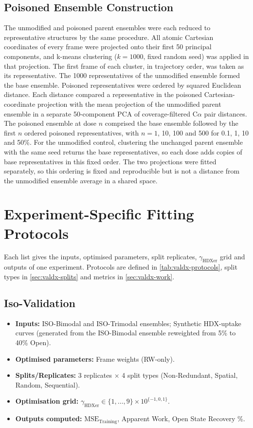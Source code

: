\subsection{Poisoned Ensemble Construction}
\label{app:valdx-poison-construction}

The unmodified and poisoned parent ensembles were each reduced to representative structures by the same procedure. All atomic Cartesian coordinates of every frame were projected onto their first 50 principal components, and k-means clustering ($k=1000$, fixed random seed) was applied in that projection. The first frame of each cluster, in trajectory order, was taken as its representative. The 1000 representatives of the unmodified ensemble formed the base ensemble. Poisoned representatives were ordered by squared Euclidean distance. Each distance compared a representative in the poisoned Cartesian-coordinate projection with the mean projection of the unmodified parent ensemble in a separate 50-component PCA of coverage-filtered C$\alpha$ pair distances. The poisoned ensemble at dose $n$ comprised the base ensemble followed by the first $n$ ordered poisoned representatives, with $n=1$, 10, 100 and 500 for 0.1, 1, 10 and 50\%. For the unmodified control, clustering the unchanged parent ensemble with the same seed returns the base representatives, so each dose adds copies of base representatives in this fixed order. The two projections were fitted separately, so this ordering is fixed and reproducible but is not a distance from the unmodified ensemble average in a shared space.

\section{Experiment-Specific Fitting Protocols}
\label{app:valdx-case-studies}

Each list gives the inputs, optimised parameters, split replicates, $\gamma_\text{HDXer}$ grid and outputs of one experiment. Protocols are defined in \cref{tab:valdx-protocols}, split types in \cref{sec:valdx-splits} and metrics in \cref{sec:valdx-work}.

\begingroup
\raggedright

\subsection{Iso-Validation}
\label{app:valdx-case-iso}
\begin{itemize}
    \item \textbf{Inputs:} ISO-Bimodal and ISO-Trimodal ensembles; Synthetic HDX-uptake curves (generated from the ISO-Bimodal ensemble reweighted from 5\% to 40\% Open).
    \item \textbf{Optimised parameters:} Frame weights (RW-only).
    \item \textbf{Splits/Replicates:} 3 replicates $\times$ 4 split types (Non-Redundant, Spatial, Random, Sequential).
    \item \textbf{Optimisation grid:} $\gamma_\text{HDXer} \in \{1, \dots, 9\} \times 10^{\{-1, 0, 1\}}$.
    \item \textbf{Outputs computed:} $\text{MSE}_\text{Training}$, Apparent Work, Open State Recovery \%.
\end{itemize}

